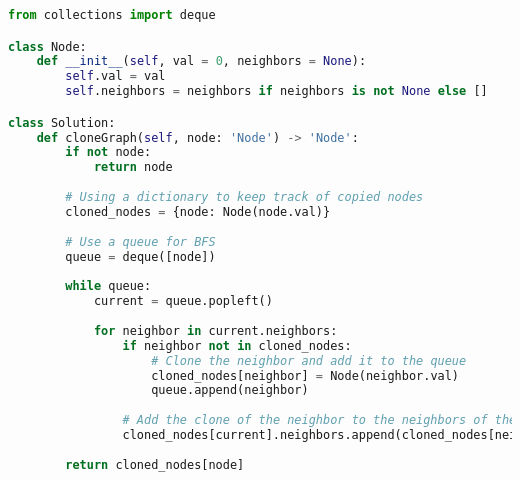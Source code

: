 \begin{fullwidth}
\begin{lstlisting}[language=Python]
from collections import deque

class Node:
    def __init__(self, val = 0, neighbors = None):
        self.val = val
        self.neighbors = neighbors if neighbors is not None else []

class Solution:
    def cloneGraph(self, node: 'Node') -> 'Node':
        if not node:
            return node
            
        # Using a dictionary to keep track of copied nodes
        cloned_nodes = {node: Node(node.val)}
        
        # Use a queue for BFS
        queue = deque([node])
        
        while queue:
            current = queue.popleft()
            
            for neighbor in current.neighbors:
                if neighbor not in cloned_nodes:
                    # Clone the neighbor and add it to the queue
                    cloned_nodes[neighbor] = Node(neighbor.val)
                    queue.append(neighbor)
                    
                # Add the clone of the neighbor to the neighbors of the clone node
                cloned_nodes[current].neighbors.append(cloned_nodes[neighbor])
                
        return cloned_nodes[node]
\end{lstlisting}
\end{fullwidth}

